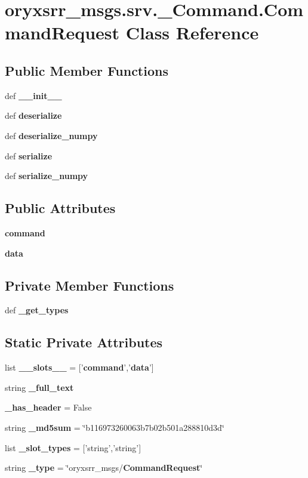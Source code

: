 \section{oryxsrr\-\_\-msgs.\-srv.\-\_\-\-Command.\-Command\-Request \-Class \-Reference}
\label{classoryxsrr__msgs_1_1srv_1_1__Command_1_1CommandRequest}
\subsection*{\-Public \-Member \-Functions}
\begin{DoxyCompactItemize}
\item 
def {\bf \-\_\-\-\_\-init\-\_\-\-\_\-}
\item 
def {\bf deserialize}
\item 
def {\bf deserialize\-\_\-numpy}
\item 
def {\bf serialize}
\item 
def {\bf serialize\-\_\-numpy}
\end{DoxyCompactItemize}
\subsection*{\-Public \-Attributes}
\begin{DoxyCompactItemize}
\item 
{\bf command}
\item 
{\bf data}
\end{DoxyCompactItemize}
\subsection*{\-Private \-Member \-Functions}
\begin{DoxyCompactItemize}
\item 
def {\bf \-\_\-get\-\_\-types}
\end{DoxyCompactItemize}
\subsection*{\-Static \-Private \-Attributes}
\begin{DoxyCompactItemize}
\item 
list {\bf \-\_\-\-\_\-slots\-\_\-\-\_\-} = ['{\bf command}','{\bf data}']
\item 
string {\bf \-\_\-full\-\_\-text}
\item 
{\bf \-\_\-has\-\_\-header} = \-False
\item 
string {\bf \-\_\-md5sum} = \char`\"{}b116973260063b7b02b501a288810d3d\char`\"{}
\item 
list {\bf \-\_\-slot\-\_\-types} = ['string','string']
\item 
string {\bf \-\_\-type} = \char`\"{}oryxsrr\-\_\-msgs/{\bf \-Command\-Request}\char`\"{}
\end{DoxyCompactItemize}


